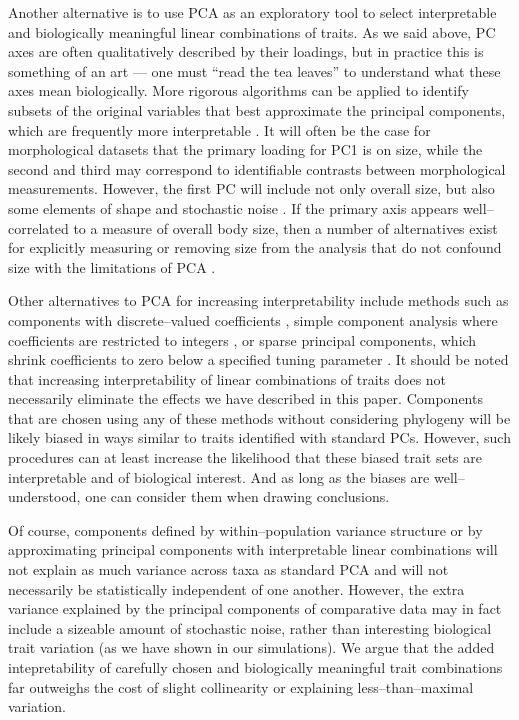 \documentclass[a4paper,11pt]{article}
\begin{document}
Another alternative is to use PCA as an exploratory tool to select interpretable and biologically meaningful linear combinations of traits. As we said above, PC axes are often qualitatively described by their loadings, but in practice this is something of an art --- one must ``read the tea leaves'' to understand what these axes mean biologically. More rigorous algorithms can be applied to identify subsets of the original variables that best approximate the principal components, which are frequently more interpretable \citep{Cadima2001}. It will often be the case for morphological datasets that the primary loading for PC1 is on size, while the second and third may correspond to identifiable contrasts between morphological measurements. However, the first PC will include not only overall size, but also some elements of shape and stochastic noise \citep{Somers1986, Somers1989}. If the primary axis appears well--correlated to a measure of overall body size, then a number of alternatives exist for explicitly measuring or removing size from the analysis that do not confound size with the limitations of PCA \citep{Somers1989}. 

Other alternatives to PCA for increasing interpretability include methods such as components with discrete--valued coefficients \citep{Hausman1982}, simple component analysis where coefficients are restricted to integers \citep{Vines2000}, or sparse principal components, which shrink coefficients to zero below a specified tuning parameter \citep{Jolliffe2002, Zou2006}. It should be noted that increasing interpretability of linear combinations of traits does not necessarily eliminate the effects we have described in this paper. Components that are chosen using any of these methods without considering phylogeny will be likely biased in ways similar to traits identified with standard PCs. However, such procedures can at least increase the likelihood that these biased trait sets are interpretable and of biological interest. And as long as the biases are well--understood, one can consider them when drawing conclusions.  

Of course, components defined by within--population variance structure or by approximating principal components with interpretable linear combinations will not explain as much variance across taxa as standard PCA and will not necessarily be statistically independent of one another. However, the extra variance explained by the principal components of comparative data may in fact include a sizeable amount of stochastic noise, rather than interesting biological trait variation (as we have shown in our simulations). We argue that the added intepretability of carefully chosen and biologically meaningful trait combinations far outweighs the cost of slight collinearity or explaining less--than--maximal variation.
\end{document}
